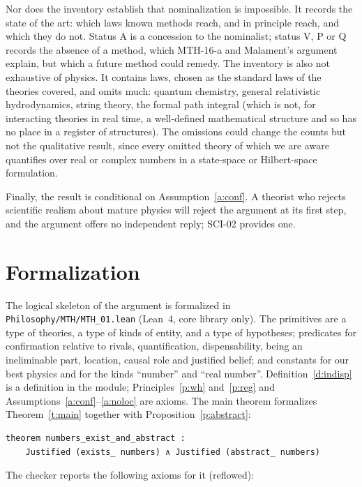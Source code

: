 \documentclass{situationist-preprint}
\begin{document}
Nor does the inventory establish that nominalization is impossible. It records the state of the art: which laws known methods reach, and in principle reach, and which they do not. Status A is a concession to the nominalist; status V, P or Q records the absence of a method, which MTH-16-a and Malament's argument explain, but which a future method could remedy. The inventory is also not exhaustive of physics. It contains \nLaws{} laws, chosen as the standard laws of the theories covered, and omits much: quantum chemistry, general relativistic hydrodynamics, string theory, the formal path integral (which is not, for interacting theories in real time, a well-defined mathematical structure and so has no place in a register of structures). The omissions could change the counts but not the qualitative result, since every omitted theory of which we are aware quantifies over real or complex numbers in a state-space or Hilbert-space formulation.

Finally, the result is conditional on Assumption~\ref{a:conf}. A theorist who rejects scientific realism about mature physics will reject the argument at its first step, and the argument offers no independent reply; SCI-02 provides one.

\section{Formalization}\label{s:formal}

The logical skeleton of the argument is formalized in \nolinkurl{Philosophy/MTH/MTH_01.lean} (Lean~4, core library only). The primitives are a type of theories, a type of kinds of entity, and a type of hypotheses; predicates for confirmation relative to rivals, quantification, dispensability, being an ineliminable part, location, causal role and justified belief; and constants for our best physics and for the kinds \enquote{number} and \enquote{real number}. Definition~\ref{d:indisp} is a definition in the module; Principles~\ref{p:wh} and~\ref{p:reg} and Assumptions~\ref{a:conf}--\ref{a:noloc} are axioms. The main theorem formalizes Theorem~\ref{t:main} together with Proposition~\ref{p:abstract}:

\begin{lstlisting}
theorem numbers_exist_and_abstract :
    Justified (exists_ numbers) ∧ Justified (abstract_ numbers)
\end{lstlisting}

The checker reports the following axioms for it (reflowed):
\end{document}
